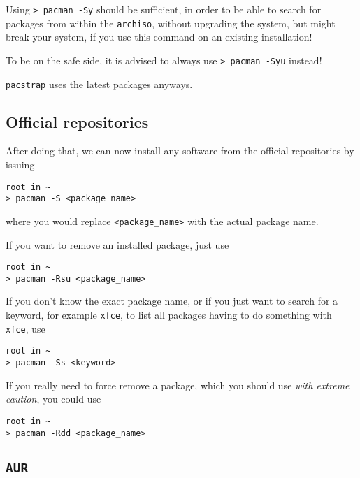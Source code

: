 \documentclass[10pt]{dustdoc}
\begin{document}
\begin{WARNING}
    Using \texttt{> pacman -Sy} should be sufficient, in order to be able to search for packages from within the \texttt{archiso}, without upgrading the system, but might break your system, if you use this command on an existing installation!

    To be on the safe side, it is advised to always use \texttt{> pacman -Syu} instead!

    \texttt{pacstrap} uses the latest packages anyways.
\end{WARNING}

\subsection{Official repositories}%
\label{sec:official-repositories}

After doing that, we can now install any software from the official repositories by issuing

\begin{verbatim}
root in ~
> pacman -S <package_name>
\end{verbatim}

\noindent
where you would replace \texttt{<package\_name>} with the actual package name.

If you want to remove an installed package, just use

\begin{verbatim}
root in ~
> pacman -Rsu <package_name>
\end{verbatim}

If you don’t know the exact package name, or if you just want to search for a keyword, for example \texttt{xfce}, to list all packages having to do something with \texttt{xfce}, use

\begin{verbatim}
root in ~
> pacman -Ss <keyword>
\end{verbatim}

\begin{CAUTION}
    If you really need to force remove a package, which you should use \emph{with extreme caution}, you could use

    \begin{verbatim}
root in ~
> pacman -Rdd <package_name>
    \end{verbatim}
\end{CAUTION}

\subsection{\texttt{AUR}}%
\label{sec:aur}
\end{document}
